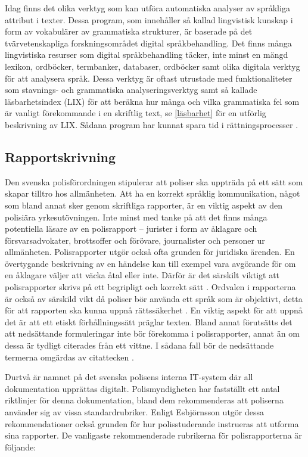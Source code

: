 \documentclass[swedish]{maucsthesis}
\begin{document}
Idag finns det olika verktyg som kan utföra automatiska analyser av språkliga
attribut i texter. Dessa program, som innehåller så kallad lingvistisk kunskap
i form av vokabulärer av grammatiska strukturer, är baserade på det
tvärvetenskapliga forskningsområdet digital språkbehandling. Det finns många lingvistiska
resurser som digital språkbehandling täcker, inte minst en mängd lexikon, ordböcker,
termbanker, databaser, ordböcker samt olika digitala verktyg för att analysera
språk. Dessa verktyg är oftast utrustade med funktionaliteter som stavnings- och
grammatiska analyseringsverktyg samt så kallade läsbarhetsindex (LIX) för att beräkna hur många och vilka grammatiska fel som är vanligt förekommande i en skriftlig text, se \cref{läsbarhet} för en utförlig beskrivning av LIX. Sådana program har kunnat
spara tid i rättningsprocesser \cite{wengelin:2017}.

\subsection{Rapportskrivning}

Den svenska polisförordningen stipulerar att poliser ska uppträda på ett sätt
som skapar tilltro hos allmänheten. Att ha en korrekt språklig kommunikation,
något som bland annat sker genom skriftliga rapporter, är en viktig aspekt av
den polisiära yrkesutövningen. Inte minst med tanke på att det finns många
potentiella läsare av en polisrapport – jurister i form av åklagare och
försvarsadvokater, brottsoffer och förövare, journalister och personer ur
allmänheten. Polisrapporter utgör också ofta grunden för juridiska ärenden. En
övertygande beskrivning av en händelse kan till exempel vara avgörande för om en
åklagare väljer att väcka åtal eller inte. Därför är det särskilt viktigt att
polisrapporter skrivs på ett begripligt och korrekt sätt \cite{ask:2013}.
Ordvalen i rapporterna är också av särskild vikt då poliser bör använda ett
språk som är objektivt, detta för att rapporten ska kunna uppnå rättssäkerhet
\cite{ask:2018}. En viktig aspekt för att uppnå det är att ett etiskt
förhållningssätt präglar texten. Bland annat förutsätts det att nedsättande
formuleringar inte bör förekomma i polisrapporter, annat än om dessa är tydligt
citerades från ett vittne. I sådana fall bör de nedsättande termerna omgärdas av
citattecken \cite{ask:2013}.

Durtvå är namnet på det svenska polisens interna IT-system där all dokumentation
upprättas digitalt. Polismyndigheten har fastställt ett antal riktlinjer för
denna dokumentation, bland dem rekommenderas att poliserna använder sig av vissa
standardrubriker. Enligt Esbjörnsson utgör dessa rekommendationer också
grunden för hur polisstuderande instrueras att utforma sina rapporter. De
vanligaste rekommenderade rubrikerna för polisrapporterna är följande:
\end{document}
